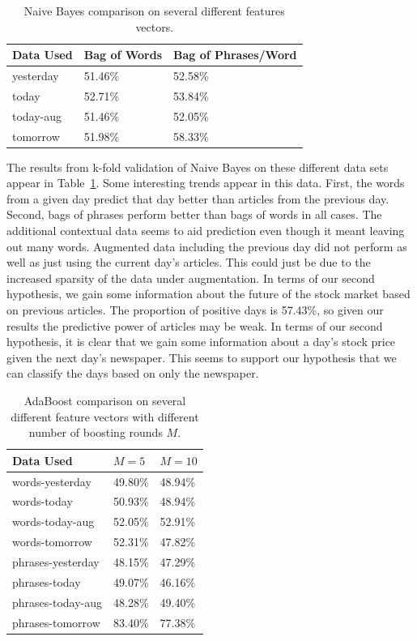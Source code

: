 \documentclass[10pt, twocolumn]{article}
\begin{document}
\begin{table}[h]
\centering
\begin{tabular}{|l|l|l|} \hline
Data Used & Bag of Words & Bag of Phrases/Word \\ \hline
yesterday & 51.46\% & 52.58\% \\
today & 52.71\% & 53.84\% \\
today-aug & 51.46\% & 52.05\% \\
tomorrow & 51.98\% & 58.33\% \\ \hline
\end{tabular}
\caption{Naive Bayes comparison on several different features vectors.}
\label{tab:nbcompare}
\end{table}

The results from k-fold validation of Naive Bayes on these different data sets appear in Table~\ref{tab:nbcompare}. Some interesting trends appear in this data. First, the words from a given day predict that day better than articles from the previous day. Second, bags of phrases perform better than bags of words in all cases. The additional contextual data seems to aid prediction even though it meant leaving out many words. Augmented data including the previous day did not perform as well as just using the current day's articles. This could just be due to the increased sparsity of the data under augmentation. In terms of our second hypothesis, we gain some information about the future of the stock market based on previous articles. The proportion of positive days is 57.43\%, so given our results the predictive power of articles may be weak. In terms of our second hypothesis, it is clear that we gain some information about a day's stock price given the next day's newspaper. This seems to support our hypothesis that we can classify the days based on only the newspaper.

\begin{table}[h]
\centering
\begin{tabular}{|l|l|l|}
\hline
Data Used & $M = 5$ & $M = 10$ \\ \hline
words-yesterday & 49.80\% & 48.94\% \\
words-today     & 50.93\% & 48.94\% \\
words-today-aug & 52.05\% & 52.91\% \\
words-tomorrow  & 52.31\% & 47.82\% \\ \hline
phrases-yesterday & 48.15\% & 47.29\% \\ 
phrases-today    & 49.07\% & 46.16\% \\
phrases-today-aug & 48.28\% & 49.40\% \\
phrases-tomorrow  & 83.40\% & 77.38\% \\ \hline
\end{tabular}
\caption{AdaBoost comparison on several different feature vectors with different number of boosting rounds $M$.}
\label{tab:adacompare}
\end{table}
\end{document}
